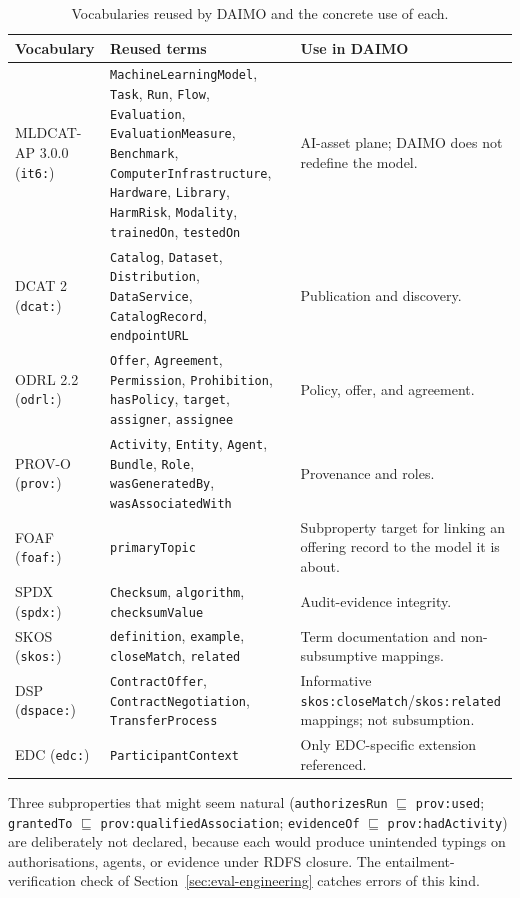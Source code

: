 \documentclass[11pt,a4paper]{article}
\newcommand{\code}[1]{\texttt{#1}}
\begin{document}
\begin{table}[t]
\small\sf\centering
\caption{Vocabularies reused by DAIMO and the concrete use of each.\label{tab:reuse}}
\begin{tabular}{@{}p{2.6cm}p{5cm}p{7cm}@{}}
\toprule
\textbf{Vocabulary} & \textbf{Reused terms} & \textbf{Use in DAIMO} \\
\midrule
MLDCAT-AP 3.0.0 (\code{it6:}) & \code{MachineLearningModel}, \code{Task}, \code{Run}, \code{Flow}, \code{Evaluation}, \code{EvaluationMeasure}, \code{Benchmark}, \code{ComputerInfrastructure}, \code{Hardware}, \code{Library}, \code{HarmRisk}, \code{Modality}, \code{trainedOn}, \code{testedOn} & AI-asset plane; DAIMO does not redefine the model. \\
DCAT 2 (\code{dcat:}) & \code{Catalog}, \code{Dataset}, \code{Distribution}, \code{DataService}, \code{CatalogRecord}, \code{endpointURL} & Publication and discovery. \\
ODRL 2.2 (\code{odrl:}) & \code{Offer}, \code{Agreement}, \code{Permission}, \code{Prohibition}, \code{hasPolicy}, \code{target}, \code{assigner}, \code{assignee} & Policy, offer, and agreement. \\
PROV-O (\code{prov:}) & \code{Activity}, \code{Entity}, \code{Agent}, \code{Bundle}, \code{Role}, \code{wasGeneratedBy}, \code{wasAssociatedWith} & Provenance and roles. \\
FOAF (\code{foaf:})~\cite{foaf} & \code{primaryTopic} & Subproperty target for linking an offering record to the model it is about. \\
SPDX (\code{spdx:})~\cite{spdx} & \code{Checksum}, \code{algorithm}, \code{checksumValue} & Audit-evidence integrity. \\
SKOS (\code{skos:})~\cite{skos} & \code{definition}, \code{example}, \code{closeMatch}, \code{related} & Term documentation and non-subsumptive mappings. \\
DSP (\code{dspace:}) & \code{ContractOffer}, \code{ContractNegotiation}, \code{TransferProcess} & Informative \code{skos:closeMatch}/\code{skos:related} mappings; not subsumption. \\
EDC (\code{edc:}) & \code{ParticipantContext} & Only EDC-specific extension referenced. \\
\bottomrule
\end{tabular}
\end{table}

Three subproperties that might seem natural (\code{authorizesRun} $\sqsubseteq$ \code{prov:used}; \code{grantedTo} $\sqsubseteq$ \code{prov:qualifiedAssociation}; \code{evidenceOf} $\sqsubseteq$ \code{prov:hadActivity}) are deliberately not declared, because each would produce unintended typings on authorisations, agents, or evidence under RDFS closure. The entailment-verification check of Section~\ref{sec:eval-engineering} catches errors of this kind.
\end{document}

